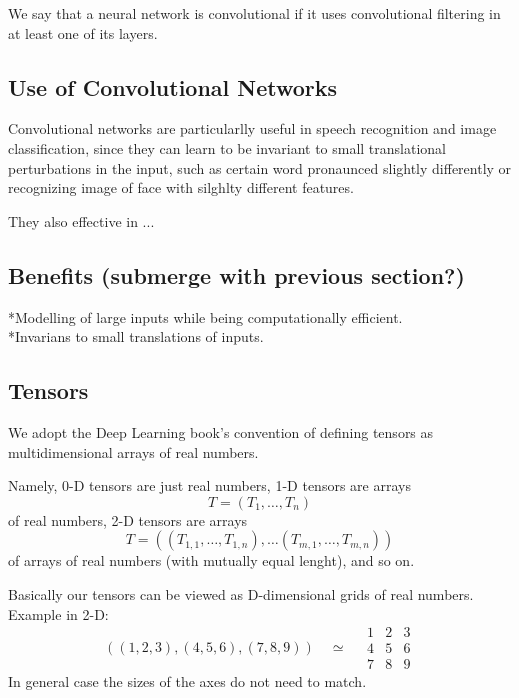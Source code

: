 \documentclass[]{article}
\begin{document}
We say that a neural network is convolutional if it uses convolutional filtering
in at least one of its layers.

\subsection{Use of Convolutional Networks}
Convolutional networks are particularlly useful in speech recognition and image
classification, since they can learn to be invariant to small translational
perturbations in the input, such as certain word pronaunced slightly differently
or recognizing image of face with silghlty different features.

They also effective in ...
%

\subsection{Benefits (submerge with previous section?)}
*Modelling of large inputs while being computationally efficient.\\
*Invarians to small translations of inputs.

\subsection{Tensors}
We adopt the Deep Learning book's convention of defining tensors as
multidimensional arrays of real numbers.

Namely, 0-D tensors are just real numbers, 1-D tensors are arrays
\[
T = (T_1, \ldots, T_n)
\]
of real numbers, 2-D tensors are arrays
\[
T = ((T_{1,1}, \ldots, T_{1,n}), \ldots (T_{m,1}, \ldots, T_{m,n}))
\]
of arrays of real numbers (with mutually equal lenght), and so on.

Basically our tensors can be viewed as D-dimensional grids of real numbers.
Example in 2-D:
\[
((1, 2, 3), (4, 5, 6), (7, 8, 9)) \quad \simeq \quad
\begin{array}{c|c|c}
  1 & 2 & 3 \\
  \hline
  4 & 5 & 6 \\
  \hline
  7 & 8 & 9
 \end{array}
\]
In general case the sizes of the axes do not need to match.

\end{document}
